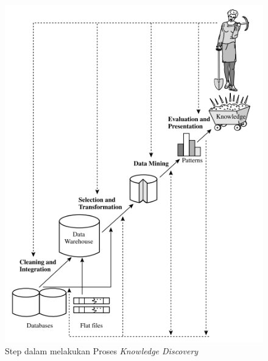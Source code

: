 \begin{figure}
\centering
\includegraphics[scale=0.5]{Gambar/data-mini-process.png}
\caption[Step dalam melakukan Proses \textit{Knowledge Discovery}]{Step dalam melakukan Proses \textit{Knowledge Discovery} \cite{han2011data}} 
\end{figure}


